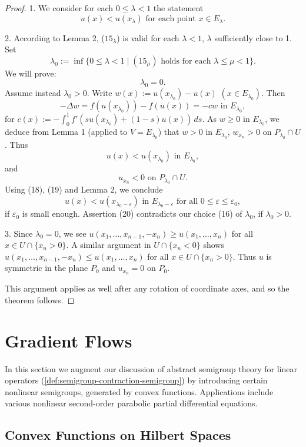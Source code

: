 \begin{proof}
1. We consider for each $0 \le \lambda < 1$ the statement
\[
u(x) < u(x_\lambda) \text{ for each point } x \in E_\lambda.
\tag{$15_\lambda$}
\]

2. According to Lemma 2, ($15_\lambda$) is valid for each $\lambda < 1$, $\lambda$ sufficiently close to 1. Set
\[
\lambda_0 := \inf\{0 \le \lambda < 1 \mid (15_\mu) \text{ holds for each } \lambda \le \mu < 1\}.
\tag{16}
\]
We will prove:
\[
\lambda_0 = 0.
\tag{17}
\]
Assume instead $\lambda_0 > 0$. Write $w(x) := u(x_{\lambda_0}) - u(x)$ $(x \in E_{\lambda_0})$. Then
\[
-\Delta w = f(u(x_{\lambda_0})) - f(u(x)) = -cw \text{ in } E_{\lambda_0},
\]
for $c(x) := -\int_0^1 f'(su(x_{\lambda_0}) + (1-s)u(x)) \, ds$. As $w \ge 0$ in $E_{\lambda_0}$, we deduce from Lemma 1 (applied to $V = E_{\lambda_0}$) that $w > 0$ in $E_{\lambda_0}$, $w_{x_n} > 0$ on $P_{\lambda_0} \cap U$. Thus
\[
u(x) < u(x_{\lambda_0}) \text{ in } E_{\lambda_0},
\tag{18}
\]
and
\[
u_{x_n} < 0 \text{ on } P_{\lambda_0} \cap U.
\tag{19}
\]
Using (18), (19) and Lemma 2, we conclude
\[
u(x) < u(x_{\lambda_0-\varepsilon}) \text{ in } E_{\lambda_0-\varepsilon} \text{ for all } 0 \le \varepsilon \le \varepsilon_0,
\tag{20}
\]
if $\varepsilon_0$ is small enough. Assertion (20) contradicts our choice (16) of $\lambda_0$, if $\lambda_0 > 0$.

3. Since $\lambda_0 = 0$, we see $u(x_1, \ldots, x_{n-1}, -x_n) \ge u(x_1, \ldots, x_n)$ for all $x \in U \cap \{x_n > 0\}$. A similar argument in $U \cap \{x_n < 0\}$ shows $u(x_1, \ldots, x_{n-1}, -x_n) \le u(x_1, \ldots, x_n)$ for all $x \in U \cap \{x_n > 0\}$. Thus $u$ is symmetric in the plane $P_0$ and $u_{x_n} = 0$ on $P_0$.

This argument applies as well after any rotation of coordinate axes, and so the theorem follows.
\end{proof}

\section{Gradient Flows}
\label{sec:gradient-flows}

In this section we augment our discussion of abstract semigroup theory for linear operators (\cref{def:semigroup-contraction-semigroup}) by introducing certain nonlinear semigroups, generated by convex functions. Applications include various nonlinear second-order parabolic partial differential equations.

\subsection{Convex Functions on Hilbert Spaces}
\label{sec:convex-functions-hilbert-spaces}

